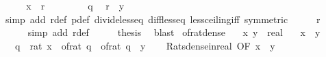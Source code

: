 \begin{isabellebody}
\ \ \isamarkupfalse%
\ \isamarkupfalse%
\ {\isachardoublequoteopen}x\ {\isacharless}{\kern0pt}\ r{\isachardoublequoteclose}\ \isacommand{{\isachardot}{\kern0pt}}\isamarkupfalse%
\isanewline
\ \ \isamarkupfalse%
\ \isamarkupfalse%
\ {\isacartoucheopen}{}\ {\isacharless}{\kern0pt}\ q{\isacartoucheclose}\ \isamarkupfalse%
\ {\isachardoublequoteopen}r\ {\isacharless}{\kern0pt}\ y{\isachardoublequoteclose}\isanewline
\ \ \ \ \isamarkupfalse%
\ {\isacharparenleft}{\kern0pt}simp\ add{\isacharcolon}{\kern0pt}\ r{\isacharunderscore}{\kern0pt}def\ p{\isacharunderscore}{\kern0pt}def\ divide{\isacharunderscore}{\kern0pt}less{\isacharunderscore}{\kern0pt}eq\ diff{\isacharunderscore}{\kern0pt}less{\isacharunderscore}{\kern0pt}eq\ less{\isacharunderscore}{\kern0pt}ceiling{\isacharunderscore}{\kern0pt}iff\ {\isacharbrackleft}{\kern0pt}symmetric{\isacharbrackright}{\kern0pt}{\isacharparenright}{\kern0pt}\isanewline
\ \ \isamarkupfalse%
\ \isamarkupfalse%
\ {\isachardoublequoteopen}r\ {\isasymin}\ {\isasymrat}{\isachardoublequoteclose}\isanewline
\ \ \ \ \isamarkupfalse%
\ {\isacharparenleft}{\kern0pt}simp\ add{\isacharcolon}{\kern0pt}\ r{\isacharunderscore}{\kern0pt}def{\isacharparenright}{\kern0pt}\isanewline
\ \ \isamarkupfalse%
\ \isamarkupfalse%
\ {\isacharquery}{\kern0pt}thesis\ \isamarkupfalse%
\ blast\isanewline
{}\isamarkupfalse%
%
\endisatagproof
{\isafoldproof}%
%
\isadelimproof
\isanewline
%
\endisadelimproof
\isanewline
{}\isamarkupfalse%
\ of{\isacharunderscore}{\kern0pt}rat{\isacharunderscore}{\kern0pt}dense{\isacharcolon}{\kern0pt}\isanewline
\ \ \ x\ y\ {\isacharcolon}{\kern0pt}{\isacharcolon}{\kern0pt}\ real\isanewline
\ \ \ {\isachardoublequoteopen}x\ {\isacharless}{\kern0pt}\ y{\isachardoublequoteclose}\isanewline
\ \ \ {\isachardoublequoteopen}{\isasymexists}q\ {\isacharcolon}{\kern0pt}{\isacharcolon}{\kern0pt}\ rat{\isachardot}{\kern0pt}\ x\ {\isacharless}{\kern0pt}\ of{\isacharunderscore}{\kern0pt}rat\ q\ {\isasymand}\ of{\isacharunderscore}{\kern0pt}rat\ q\ {\isacharless}{\kern0pt}\ y{\isachardoublequoteclose}\isanewline
%
\isadelimproof
\ \ %
\endisadelimproof
%
\isatagproof
{}\isamarkupfalse%
\ Rats{\isacharunderscore}{\kern0pt}dense{\isacharunderscore}{\kern0pt}in{\isacharunderscore}{\kern0pt}real\ {\isacharbrackleft}{\kern0pt}OF\ {\isacartoucheopen}x\ {\isacharless}{\kern0pt}\ y{\isacartoucheclose}{\isacharbrackright}{\kern0pt}\isanewline

\end{isabellebody}
